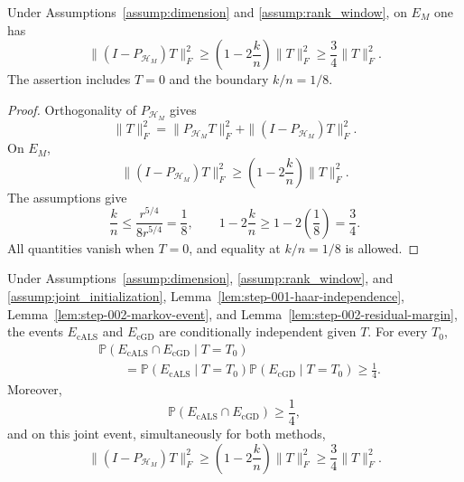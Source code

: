 \begin{lemma}\label{lem:step-002-residual-margin}
Under Assumptions~\ref{assump:dimension} and \ref{assump:rank_window}, on
$E_M$ one has
\[
 \|(I-P_{\mathcal H_M})T\|_F^2
 \ge\left(1-2\frac{k}{n}\right)\|T\|_F^2
 \ge\frac34\|T\|_F^2.
\]
The assertion includes $T=0$ and the boundary $k/n=1/8$.
\end{lemma}

\begin{proof}
Orthogonality of $P_{\mathcal H_M}$ gives
\[
 \|T\|_F^2
 =\|P_{\mathcal H_M}T\|_F^2
 +\|(I-P_{\mathcal H_M})T\|_F^2.
\]
On $E_M$,
\[
 \|(I-P_{\mathcal H_M})T\|_F^2
 \ge\left(1-2\frac{k}{n}\right)\|T\|_F^2.
\]
The assumptions give
\[
 \frac{k}{n}\le\frac{r^{5/4}}{8r^{5/4}}=\frac18,
 \qquad
 1-2\frac{k}{n}\ge1-2\left(\frac18\right)=\frac34.
\]
All quantities vanish when $T=0$, and equality at $k/n=1/8$ is allowed.
\end{proof}

\begin{proposition}\label{prop:step-002-joint-event}
Under Assumptions~\ref{assump:dimension}, \ref{assump:rank_window}, and
\ref{assump:joint_initialization}, Lemma~\ref{lem:step-001-haar-independence},
Lemma~\ref{lem:step-002-markov-event}, and
Lemma~\ref{lem:step-002-residual-margin}, the events
$E_{\mathrm{cALS}}$ and $E_{\mathrm{cGD}}$ are conditionally independent
given $T$.  For every $T_0$,
\[
 \begin{aligned}
 &\mathbb P(E_{\mathrm{cALS}}\cap E_{\mathrm{cGD}}\mid T=T_0)\\
 &\qquad=\mathbb P(E_{\mathrm{cALS}}\mid T=T_0)
 \mathbb P(E_{\mathrm{cGD}}\mid T=T_0)\ge\frac14.
 \end{aligned}
\]
Moreover,
\[
 \mathbb P(E_{\mathrm{cALS}}\cap E_{\mathrm{cGD}})\ge\frac14,
\]
and on this joint event, simultaneously for both methods,
\[
 \|(I-P_{\mathcal H_M})T\|_F^2
 \ge\left(1-2\frac{k}{n}\right)\|T\|_F^2
 \ge\frac34\|T\|_F^2.
\]
\end{proposition}

